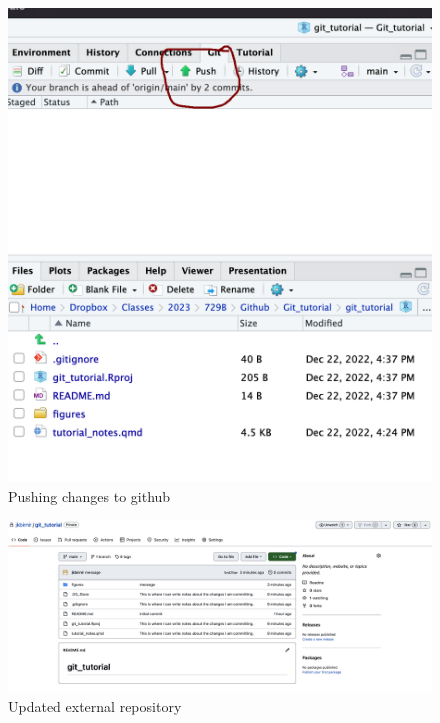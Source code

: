 \documentclass[
  letterpaper,
  DIV=11,
  numbers=noendperiod]{scrartcl}
\begin{document}
\begin{figure}

{\centering \includegraphics{figures/14.PNG}

}

\caption{Pushing changes to github}

\end{figure}

\begin{figure}

{\centering \includegraphics{figures/15.PNG}

}

\caption{Updated external repository}

\end{figure}
\end{document}
